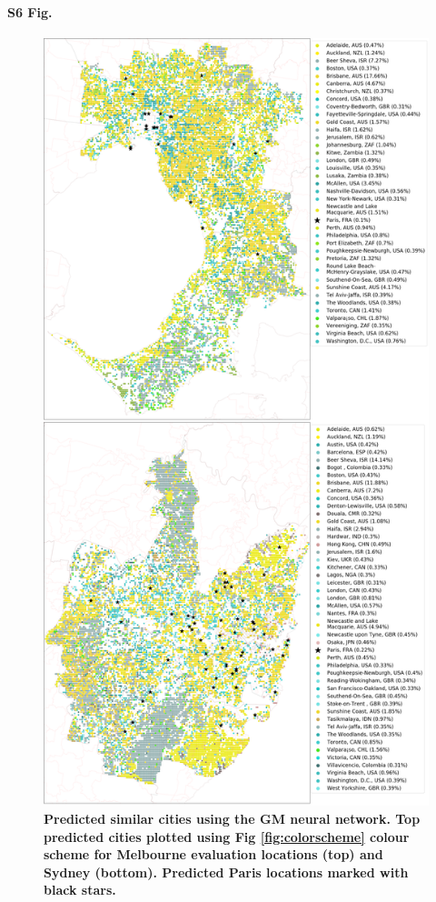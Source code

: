 \documentclass[10pt,letterpaper,hidelinks]{article}
\begin{document}
\paragraph*{S6 Fig.}
\begin{figure}[!htbp]
\centering   
\includegraphics[scale=0.33]{Images/PlosOne/Fig6.png}  
\caption{\bf Predicted similar cities using the GM neural network. Top predicted cities plotted using Fig \ref{fig:colorscheme} colour scheme for Melbourne evaluation locations (top) and Sydney (bottom). Predicted Paris locations marked with black stars.}    
 \label{fig:melmaps}  
\end{figure} 
\end{document}
